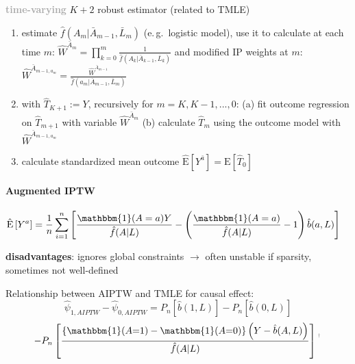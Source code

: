 \documentclass[8pt,twoside]{extarticle}
\begin{document}
\begin{multicols}{2}
{\begin{minipage}{28em}
\textbf{\textcolor{darkgray}{time-varying}}  $K+2$ robust estimator (related to TMLE)
\begin{enumerate}[leftmargin=*, itemsep=0em, topsep=0pt, partopsep=0pt,parsep=0pt]
\setlength{\itemsep}{0pt}%
\setlength{\parskip}{0pt}
\item 
estimate $\hat{f}\left(A_m|\bar{A}_{m-1}, \bar{L}_m\right)$ (e.\,g.\ logistic model), use it to \newline
calculate at each time $m$: $\widehat{W}^{\bar{A}_m} = \prod_{k=0}^m\frac{1}{\hat{f}\left(A_k|\bar{A}_{k-1}, \bar{L}_k\right)}$ and modified IP weights at $m$: $\widehat{W}^{\bar{A}_{m-1, a_m}} = \frac{\widehat{W}^{\bar{A}_{m-1}}}{\hat{f}\left(a_m|\bar{A}_{m-1}, \bar{L}_m\right)} $
\item with $\widehat{T}_{K+1}:=Y$, recursively for $m=K, K-1, ..., 0$:\newline
 (a) fit outcome regression on $\widehat{T}_{m+1}$ with variable  $\widehat{W}^{\bar{A}_m}$\newline
 (b) calculate $\widehat{T}_{m}$ using the outcome model with $\widehat{W}^{\bar{A}_{m-1, a_m}}$
\item calculate standardized mean outcome $\widehat{\mathrm{E}}\left[Y^{\bar{a}}\right] = \mathrm{E}\left[\widehat{T}_0\right]$
\end{enumerate}

\end{minipage}}


\paragraph{Augmented IPTW} \citep{hernan2023causal}
\begin{align*}
\hat{\mathrm{E}}\left[Y^{a}\right] &= \frac{1}{n}\sum_{i=1}^n\left[
\frac{\mathbbm{1}(A=a)Y}{\hat{f}(A|L)} - \left(\frac{\mathbbm{1}(A=a)}{\hat{f}(A|L)} -1\right)\hat{b}(a,L)
\right]  %
\end{align*}

 
 \textbf{disadvantages}: ignores global constraints $\to$ often unstable if sparsity, sometimes not well-defined \citep{van2011targeted}
 

\begin{mdframed}[style=MyFrame,nobreak=true, innerleftmargin=2pt, innerrightmargin=2pt]
Relationship between AIPTW and TMLE for causal effect:
$$\hat{\psi}_{1, AIPTW} - \hat{\psi}_{0, AIPTW} = P_n\left[\hat{b}(1,L)\right] -  P_n\left[\hat{b}(0,L)\right] $$
$$ - P_n \left[  \frac{\left\{\mathbbm{1}(A{=}1)-\mathbbm{1}(A{=}0)\right\}\left(Y-\hat{b}(A,L)\right)}{\hat{f}(A|L)}\right]\textcolor{gray}{^{^\dagger}}$$


\end{mdframed}
\end{multicols}
\end{document}
